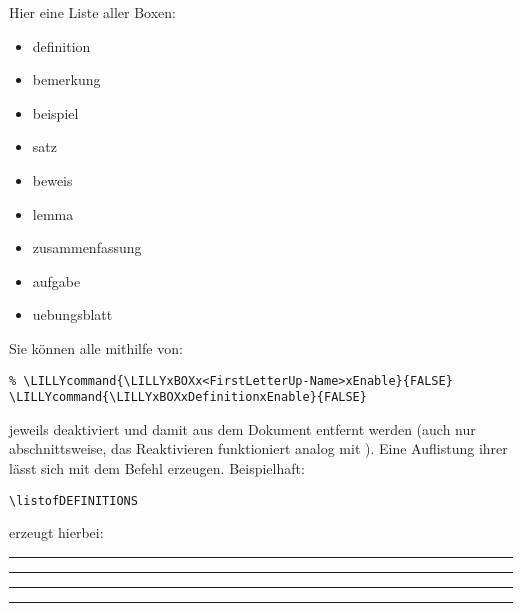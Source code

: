 Hier eine Liste aller Boxen:
\begin{multicols}{3}
    \begin{itemize}[label=$\diamond$]\narrowitems
        \item definition
        \item bemerkung
        \item beispiel
        \item satz
        \item beweis
        \item lemma
        \item zusammenfassung
        \item aufgabe
        \item uebungsblatt
    \end{itemize}
\end{multicols}
Sie können alle mithilfe von:
\begin{lstlisting}[style=latex]
%% Allgemein
% \LILLYcommand{\LILLYxBOXx<FirstLetterUp-Name>xEnable}{FALSE}
\LILLYcommand{\LILLYxBOXxDefinitionxEnable}{FALSE}
\end{lstlisting}
jeweils deaktiviert und damit aus dem Dokument entfernt werden (auch nur abschnittsweise, das Reaktivieren funktioniert analog mit ). \newline
Eine Auflistung ihrer lässt sich mit dem  Befehl erzeugen. Beispielhaft:
\begin{lstlisting}[style=latex]
\listofDEFINITIONS
\end{lstlisting}
erzeugt hierbei:\\
\rule{\linewidth}{1.2pt}\vspace{-0.75\baselineskip}
\rule{\linewidth}{0.6pt}\vspace*{-1.5cm}
\listofDEFINITIONS    
\rule{\linewidth}{0.6pt}\vspace{-0.7\baselineskip}
\rule{\linewidth}{1.2pt}

\clearpage
\newcommand{\printmark}[2][Linkname]{\ensuremath{\text{#1}^{\rightarrow~\text{\pageref{#2}}}}}






